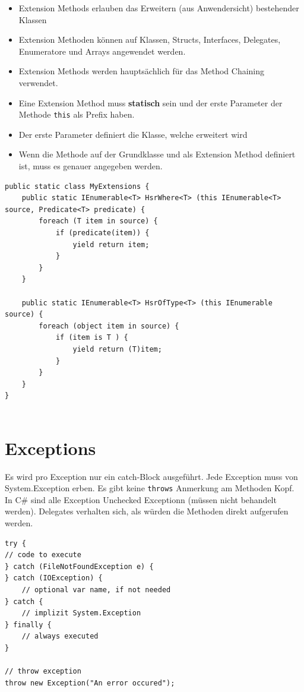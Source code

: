 \documentclass[
a4paper,
oneside,
10pt,
fleqn,
headsepline,
toc=listofnumbered, 
bibliography=totocnumbered]{scrartcl}
\let\stdsection\section
\renewcommand\section{\clearpage\stdsection}
\begin{document}
\begin{itemize}
	\item Extension Methods erlauben das Erweitern (aus Anwendersicht) bestehender Klassen
	\item Extension Methoden können auf Klassen, Structs, Interfaces, Delegates, Enumeratore und Arrays angewendet werden.
	\item Extension Methods werden hauptsächlich für das Method Chaining verwendet.
	\item Eine Extension Method muss \textbf{statisch} sein und der erste Parameter der Methode \lstinline|this| als Prefix haben. 
	\item Der erste Parameter definiert die Klasse, welche erweitert wird
	\item Wenn die Methode auf der Grundklasse und als Extension Method definiert ist, muss es genauer angegeben werden.
\end{itemize}

\begin{lstlisting}
public static class MyExtensions {
	public static IEnumerable<T> HsrWhere<T> (this IEnumerable<T> source, Predicate<T> predicate) {
		foreach (T item in source) {
			if (predicate(item)) {
				yield return item;
			}
		}
	}
	
	public static IEnumerable<T> HsrOfType<T> (this IEnumerable source) {
		foreach (object item in source) {
			if (item is T ) {
				yield return (T)item;
			}
		}
	}
}


\end{lstlisting}

\section{Exceptions}
Es wird pro Exception nur ein catch-Block ausgeführt. Jede Exception muss von System.Exception erben. Es gibt keine \lstinline|throws| Anmerkung am Methoden Kopf. In C\# sind alle Exception Unchecked Exceptionn (müssen nicht behandelt werden). Delegates verhalten sich, als würden die Methoden direkt aufgerufen werden.
\begin{lstlisting}
try {
// code to execute
} catch (FileNotFoundException e) {
} catch (IOException) {
	// optional var name, if not needed
} catch {
	// implizit System.Exception
} finally {
	// always executed
}

// throw exception
throw new Exception("An error occured");
\end{lstlisting}
\end{document}

